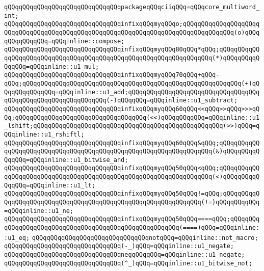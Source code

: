 \verb|qQQqqQQqqQQqqQQqqQQqqQQqqQQqqQQqpackageqQQqciiqQQq=qQQqcore_multiword_int;|\newline
\newline
\verb|qQQqqQQqqQQqqQQqqQQqqQQqqQQqqQQqinfixqQQqmyqQQqo;qQQqqQQqqQQqqQQqqQQqqQQqqQQqqQQqqQQqqQQqqQQqqQQqqQQqqQQqqQQqqQQqqQQqqQQqqQQqqQQqqQQq(o)qQQqqQQqqQQqqQQq=qQQqinline::compose;|\newline
\verb|qQQqqQQqqQQqqQQqqQQqqQQqqQQqqQQqinfixqQQqmyqQQq80qQQq*qQQq;qQQqqQQqqQQqqQQqqQQqqQQqqQQqqQQqqQQqqQQqqQQqqQQqqQQqqQQqqQQqqQQqqQQq(*)qQQqqQQqqQQqqQQq=qQQqinline::u1_mul;|\newline
\verb|qQQqqQQqqQQqqQQqqQQqqQQqqQQqqQQqinfixqQQqmyqQQq70qQQq+qQQq-qQQq;qQQqqQQqqQQqqQQqqQQqqQQqqQQqqQQqqQQqqQQqqQQqqQQqqQQqqQQqqQQq(+)qQQqqQQqqQQqqQQq=qQQqinline::u1_add;qQQqqQQqqQQqqQQqqQQqqQQqqQQqqQQqqQQqqQQqqQQqqQQqqQQqqQQqqQQqqQQq(-)qQQqqQQq=qQQqinline::u1_subtract;|\newline
\verb|qQQqqQQqqQQqqQQqqQQqqQQqqQQqqQQqinfixqQQqmyqQQq60qQQq<<qQQq>>qQQq>>>qQQq;qQQqqQQqqQQqqQQqqQQqqQQqqQQqqQQqqQQq(<<)qQQqqQQqqQQq=qQQqinline::u1_lshift;qQQqqQQqqQQqqQQqqQQqqQQqqQQqqQQqqQQqqQQqqQQqqQQqqQQq(>>)qQQq=qQQqinline::u1_rshiftl;|\newline
\verb|qQQqqQQqqQQqqQQqqQQqqQQqqQQqqQQqinfixqQQqmyqQQq60qQQq&qQQq;qQQqqQQqqQQqqQQqqQQqqQQqqQQqqQQqqQQqqQQqqQQqqQQqqQQqqQQqqQQqqQQqqQQq(&)qQQqqQQqqQQqqQQq=qQQqinline::u1_bitwise_and;|\newline
\verb|qQQqqQQqqQQqqQQqqQQqqQQqqQQqqQQqinfixqQQqmyqQQq50qQQq<qQQq;qQQqqQQqqQQqqQQqqQQqqQQqqQQqqQQqqQQqqQQqqQQqqQQqqQQqqQQqqQQqqQQqqQQq(<)qQQqqQQqqQQqqQQq=qQQqinline::u1_lt;|\newline
\verb|qQQqqQQqqQQqqQQqqQQqqQQqqQQqqQQqinfixqQQqmyqQQq50qQQq!=qQQq;qQQqqQQqqQQqqQQqqQQqqQQqqQQqqQQqqQQqqQQqqQQqqQQqqQQqqQQqqQQqqQQq(!=)qQQqqQQqqQQq=qQQqinline::u1_ne;|\newline
\verb|qQQqqQQqqQQqqQQqqQQqqQQqqQQqqQQqinfixqQQqmyqQQq50qQQq====qQQq;qQQqqQQqqQQqqQQqqQQqqQQqqQQqqQQqqQQqqQQqqQQqqQQqqQQqqQQq(====)qQQq=qQQqinline::u1_eq;|\newline
\newline
\verb|qQQqqQQqqQQqqQQqqQQqqQQqqQQqqQQqnotqQQq=qQQqinline::not_macro;|\newline
\newline
\verb|qQQqqQQqqQQqqQQqqQQqqQQqqQQqqQQq(-_)qQQq=qQQqinline::u1_negate;|\newline
\verb|qQQqqQQqqQQqqQQqqQQqqQQqqQQqqQQqnegqQQqqQQq=qQQqinline::u1_negate;|\newline
\verb|qQQqqQQqqQQqqQQqqQQqqQQqqQQqqQQq(^_)qQQq=qQQqinline::u1_bitwise_not;|\newline
